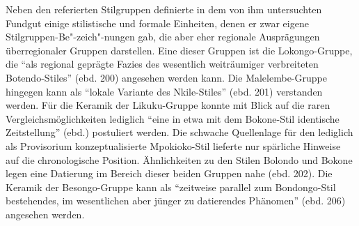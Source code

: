 Neben den referierten Stilgruppen definierte \textcite{Wotzka.1995} in dem von ihm untersuchten Fundgut einige stilistische und formale Einheiten, denen er zwar eigene Stilgruppen-Be"-zeich"-nungen gab, die aber eher regionale Ausprägungen überregionaler Gruppen darstellen. Eine dieser Gruppen ist die Lokongo-Gruppe, die \enquote{als regional geprägte Fazies des wesentlich weiträumiger verbreiteten Botendo-Stiles} (ebd. 200) angesehen werden kann. Die Malelembe-Gruppe hingegen kann als \enquote{lokale Variante des Nkile-Stiles} (ebd. 201) verstanden werden. Für die Keramik der Likuku-Gruppe konnte mit Blick auf die raren Vergleichsmöglichkeiten lediglich \enquote{eine in etwa mit dem Bokone-Stil identische Zeitstellung} (ebd.) postuliert werden. Die schwache Quellenlage für den lediglich als Provisorium konzeptualisierte Mpokioko-Stil lieferte nur spärliche Hinweise auf die chronologische Position. Ähnlichkeiten zu den Stilen Bolondo und Bokone legen eine Datierung im Bereich dieser beiden Gruppen nahe (ebd. 202). Die Keramik der Besongo-Gruppe kann als \enquote{zeitweise parallel zum Bondongo-Stil bestehendes, im wesentlichen aber jünger zu datierendes Phänomen} (ebd. 206) angesehen werden.

